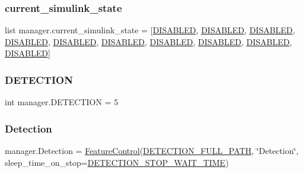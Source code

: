 \subsubsection{\texorpdfstring{current\+\_\+simulink\+\_\+state}{current\_simulink\_state}}
{\footnotesize\ttfamily list manager.\+current\+\_\+simulink\+\_\+state = \mbox{[}\hyperlink{namespacemanager_acc1a242f79d4757ccec1eafa25991b69}{D\+I\+S\+A\+B\+L\+ED}, \hyperlink{namespacemanager_acc1a242f79d4757ccec1eafa25991b69}{D\+I\+S\+A\+B\+L\+ED}, \hyperlink{namespacemanager_acc1a242f79d4757ccec1eafa25991b69}{D\+I\+S\+A\+B\+L\+ED}, \hyperlink{namespacemanager_acc1a242f79d4757ccec1eafa25991b69}{D\+I\+S\+A\+B\+L\+ED}, \hyperlink{namespacemanager_acc1a242f79d4757ccec1eafa25991b69}{D\+I\+S\+A\+B\+L\+ED}, \hyperlink{namespacemanager_acc1a242f79d4757ccec1eafa25991b69}{D\+I\+S\+A\+B\+L\+ED}, \hyperlink{namespacemanager_acc1a242f79d4757ccec1eafa25991b69}{D\+I\+S\+A\+B\+L\+ED}, \hyperlink{namespacemanager_acc1a242f79d4757ccec1eafa25991b69}{D\+I\+S\+A\+B\+L\+ED}, \hyperlink{namespacemanager_acc1a242f79d4757ccec1eafa25991b69}{D\+I\+S\+A\+B\+L\+ED}, \hyperlink{namespacemanager_acc1a242f79d4757ccec1eafa25991b69}{D\+I\+S\+A\+B\+L\+ED}\mbox{]}}

\mbox{\label{namespacemanager_a341e1745be0eb2382da0ea818411441c}} 
\subsubsection{\texorpdfstring{D\+E\+T\+E\+C\+T\+I\+ON}{DETECTION}}
{\footnotesize\ttfamily int manager.\+D\+E\+T\+E\+C\+T\+I\+ON = 5}

\mbox{\label{namespacemanager_a9fe1a53a39fe1ece9045bed8a2f69092}} 
\subsubsection{\texorpdfstring{Detection}{Detection}}
{\footnotesize\ttfamily manager.\+Detection = \hyperlink{classFeatureControl_1_1FeatureControl}{Feature\+Control}(\hyperlink{namespacemanager_a6c770a978c4d514742b18d200aa5e09e}{D\+E\+T\+E\+C\+T\+I\+O\+N\+\_\+\+F\+U\+L\+L\+\_\+\+P\+A\+TH}, \char`\"{}Detection\char`\"{}, sleep\+\_\+time\+\_\+on\+\_\+stop=\hyperlink{namespacemanager_a38f231e60cb3e2fa5c7a738460ddad61}{D\+E\+T\+E\+C\+T\+I\+O\+N\+\_\+\+S\+T\+O\+P\+\_\+\+W\+A\+I\+T\+\_\+\+T\+I\+ME})}

